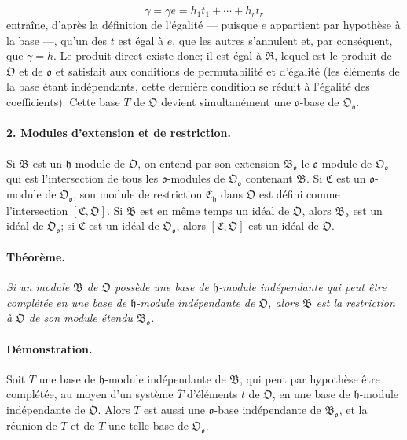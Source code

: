 \[
\gamma=\gamma e=h_1t_1+\cdots+h_rt_r
\]
entraîne, d'après la définition de l'égalité --- puisque \(e\) appartient par hypothèse à la base ---, qu'un des \(t\) est égal à \(e\), que les autres s'annulent et, par conséquent, que \(\gamma=h\). Le produit direct existe donc; il est égal à \(\mathfrak R\), lequel est le produit de \(\mathfrak O\) et de \(\mathfrak o\) et satisfait aux conditions de permutabilité et d'égalité (les éléments de la base étant indépendants, cette dernière condition se réduit à l'égalité des coefficients). Cette base \(T\) de \(\mathfrak O\) devient simultanément une \(\mathfrak o\)-base de \(\mathfrak O_{\mathfrak o}\).

\paragraph{2. Modules d'extension et de restriction.}
Si \(\mathfrak B\) est un \(\mathfrak h\)-module de \(\mathfrak O\), on entend par son extension \(\mathfrak B_{\mathfrak o}\) le \(\mathfrak o\)-module de \(\mathfrak O_{\mathfrak o}\) qui est l'intersection de tous les \(\mathfrak o\)-modules de \(\mathfrak O_{\mathfrak o}\) contenant \(\mathfrak B\). Si \(\mathfrak C\) est un \(\mathfrak o\)-module de \(\mathfrak O_{\mathfrak o}\), son module de restriction \(\mathfrak C_{\mathfrak h}\) dans \(\mathfrak O\) est défini comme l'intersection \([\mathfrak C,\mathfrak O]\). Si \(\mathfrak B\) est en même temps un idéal de \(\mathfrak O\), alors \(\mathfrak B_{\mathfrak o}\) est un idéal de \(\mathfrak O_{\mathfrak o}\); si \(\mathfrak C\) est un idéal de \(\mathfrak O_{\mathfrak o}\), alors \([\mathfrak C,\mathfrak O]\) est un idéal de \(\mathfrak O\).

\paragraph{Théorème.}
\emph{Si un module \(\mathfrak B\) de \(\mathfrak O\) possède une base de \(\mathfrak h\)-module indépendante qui peut être complétée en une base de \(\mathfrak h\)-module indépendante de \(\mathfrak O\), alors \(\mathfrak B\) est la restriction à \(\mathfrak O\) de son module étendu \(\mathfrak B_{\mathfrak o}\).}

\paragraph{Démonstration.}
Soit \(T\) une base de \(\mathfrak h\)-module indépendante de \(\mathfrak B\), qui peut par hypothèse être complétée, au moyen d'un système \(\overline T\) d'éléments \(\overline t\) de \(\mathfrak O\), en une base de \(\mathfrak h\)-module indépendante de \(\mathfrak O\). Alors \(T\) est aussi une \(\mathfrak o\)-base indépendante de \(\mathfrak B_{\mathfrak o}\), et la réunion de \(T\) et de \(\overline T\) une telle base de \(\mathfrak O_{\mathfrak o}\).

